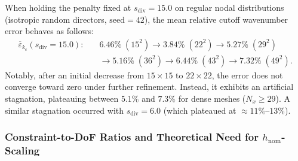 \documentclass[VANCOUVER,Times1COL]{WileyNJD-v5}
\begin{document}
When holding the penalty fixed at $s_{\mathrm{div}} = 15.0$ on regular nodal distributions (isotropic random directors, $\text{seed}=42$), the mean relative cutoff wavenumber error behaves as follows:
\begin{equation}
    \begin{aligned}
        \overline{\varepsilon}_{k_c}(s_{\mathrm{div}}=15.0): \quad & 6.46\% \; (15^2) \longrightarrow 3.84\% \; (22^2) \longrightarrow 5.27\% \; (29^2)                  \\
                                                                   & \longrightarrow 5.16\% \; (36^2) \longrightarrow 6.44\% \; (43^2) \longrightarrow 7.32\% \; (49^2).
    \end{aligned}
\end{equation}
Notably, after an initial decrease from $15 \times 15$ to $22 \times 22$, the error does not converge toward zero under further refinement. Instead, it exhibits an artificial stagnation, plateauing between $5.1\%$ and $7.3\%$ for dense meshes ($N_x \ge 29$). A similar stagnation occurred with $s_{\mathrm{div}} = 6.0$ (which plateaued at $\approx 11\%\text{--}13\%$).

\subsubsection{Constraint-to-DoF Ratios and Theoretical Need for $h_{\mathrm{nom}}$-Scaling}
\label{subsubsec:constraint_ratio_scaling}
\end{document}
